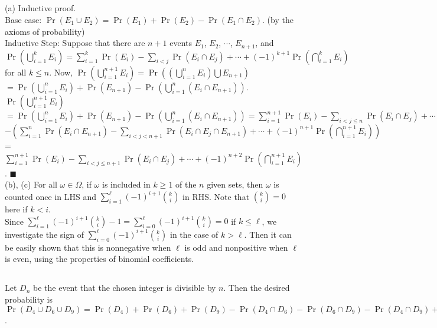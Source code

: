 \documentclass{article}
\begin{document}
\subsection{}
(a) Inductive proof.\\
Base case: $\Pr(E_1 \cup E_2) = \Pr(E_1) + \Pr(E_2) - \Pr(E_1 \cap E_2)$. (by the axioms of probability)\\
Inductive Step: Suppose that there are $n+1$ events $E_1$, $E_2$, $\cdots$, $E_{n+1}$, and $\Pr\left(\bigcup\limits_{i=1}^k E_i\right) = \sum\limits_{i=1}^k\Pr(E_i)-\sum\limits_{i<j}\Pr(E_i \cap E_j)+\cdots+(-1)^{k+1}\Pr\left(\bigcap\limits_{i=1}^k E_i \right)$ for all $k \leq n$.
Now, $\Pr\left(\bigcup\limits_{i=1}^{n+1} E_i\right) = \Pr\left(\left(\bigcup\limits_{i=1}^n E_i\right)\bigcup E_{n+1}\right)$$=\Pr\left(\bigcup\limits_{i=1}^n E_i \right) + \Pr(E_{n+1}) - \Pr\left(\bigcup\limits_{i=1}^n (E_i \cap E_{n+1})\right)$.\\
$\Pr\left(\bigcup\limits_{i=1}^{n+1} E_i\right)$$=\Pr\left(\bigcup\limits_{i=1}^n E_i \right) + \Pr(E_{n+1}) - \Pr\left(\bigcup\limits_{i=1}^n (E_i \cap E_{n+1})\right) = \sum\limits_{i=1}^{n+1}\Pr(E_i)-\sum\limits_{i<j \leq n}\Pr(E_i \cap E_j)+\cdots+(-1)^{n+1}\Pr\left(\bigcap\limits_{i=1}^n E_i \right)$\\$-\left(\sum\limits_{i=1}^n\Pr(E_i \cap E_{n+1})-\sum\limits_{i<j<n+1}\Pr(E_i \cap E_j \cap E_{n+1})+\cdots+(-1)^{n+1}\Pr\left(\bigcap\limits_{i=1}^{n+1} E_i \right)\right)$\\
= $\sum\limits_{i=1}^{n+1}\Pr(E_i)-\sum\limits_{i<j \leq n+1}\Pr(E_i \cap E_j)+\cdots+(-1)^{n+2}\Pr\left(\bigcap\limits_{i=1}^{n+1} E_i \right)$. $\blacksquare$\\
(b), (c) For all $\omega\in\Omega$, if $\omega$ is included in $k\geq 1$ of the $n$ given sets, then $\omega$ is counted once in LHS and $\sum\limits_{i=1}^\ell(-1)^{i+1}\binom{k}{i}$ in RHS.
Note that $\binom{k}{i}=0$ here if $k<i$.\\
Since $\sum\limits_{i=1}^\ell(-1)^{i+1}\binom{k}{i}-1=\sum\limits_{i=0}^\ell(-1)^{i+1}\binom{k}{i}=0$ if $k\leq \ell$,
we investigate the sign of $\sum\limits_{i=0}^\ell(-1)^{i+1}\binom{k}{i}$ in the case of $k>\ell$.
Then it can be easily shown that this is nonnegative when $\ell$ is odd and nonpositive when $\ell$ is even, using the properties of binomial coefficients.
\subsection{}
Let $D_n$ be the event that the chosen integer is divisible by $n$. Then the desired probability is $\Pr(D_4 \cup D_6 \cup D_9) = \Pr(D_4) + \Pr(D_6) + \Pr(D_9) - \Pr(D_4 \cap D_6) - \Pr(D_6 \cap D_9) - \Pr(D_4 \cap D_9) + \Pr(D_4 \cap D_6 \cap D_9) = \Pr(D_4) + \Pr(D_6) + \Pr(D_9) - \Pr(D_{12}) - \Pr(D_{18}) - \Pr(D_{36}) + \Pr(D_{36}) = 388889/1000000$.
\end{document}
